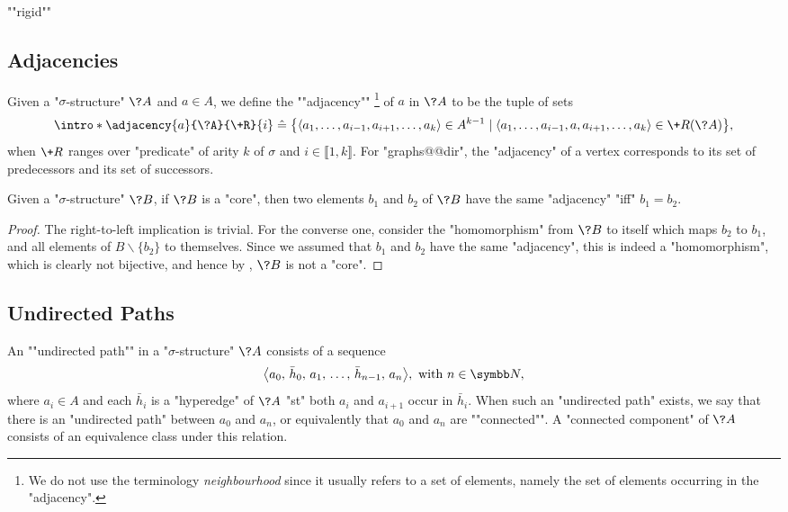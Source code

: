 \begin{itemize}
	\itemAP ""rigid""
\end{itemize}

\subsection{Adjacencies}

Given a "$\sigma$-structure" $\?A$ and $a \in A$, we define the \AP""adjacency""%
\footnote{We do not use the terminology \emph{neighbourhood} since it usually refers
to a set of elements, namely the set of elements occurring in the "adjacency".}
of $a$ in $\?A$ to be the tuple of sets
\[
	\intro*\adjacency{a}{\?A}{\+R}{i} \defeq
		\big\{
			\langle a_1, \hdots, a_{i-1}, a_{i+1}, \hdots, a_k \rangle \in A^{k-1} \mid
			\langle a_1, \hdots, a_{i-1}, a, a_{i+1}, \hdots, a_k \rangle \in \+R(\?A)
		\big\},
\]
when $\+R$ ranges over "predicate" of arity $k$ of $\sigma$ and $i \in \lBrack 1,k\rBrack$. 
For "graphs@@dir", the "adjacency" of a vertex corresponds to its set of predecessors and
its set of successors.

\begin{proposition}
	\AP\label{prop:adjacency-core}
	Given a "$\sigma$-structure" $\?B$, if $\?B$ is a "core", then
	two elements $b_1$ and $b_2$ of $\?B$ have the same "adjacency" "iff" $b_1 = b_2$.
\end{proposition}

\begin{proof}
	The right-to-left implication is trivial.
	For the converse one, consider the "homomorphism" from $\?B$ to itself
	which maps $b_2$ to $b_1$, and all elements of $B \smallsetminus \{b_2\}$
	to themselves. Since we assumed that $b_1$ and $b_2$ have the same "adjacency",
	this is indeed a "homomorphism", which is clearly not bijective, and
	hence by , $\?B$ is not a "core".
\end{proof}

\subsection{Undirected Paths}

An \AP""undirected path"" in a "$\sigma$-structure" $\?A$ consists of a sequence
\[\big\langle a_0,\, \bar h_0,\, a_1,\, \hdots,\, \bar h_{n-1},\, a_n\big\rangle, \text{ with } n \in \N,\]
where $a_i \in A$ and each $\bar h_i$ is a "hyperedge" of $\?A$ "st" both
$a_i$ and $a_{i+1}$ occur in $\bar h_i$. When such an "undirected path" exists, we say that
there is an "undirected path" between $a_0$ and $a_n$, or equivalently
that $a_0$ and $a_n$ are \AP""connected"".%
A \AP"connected component" of $\?A$ consists of an equivalence class under this relation.

